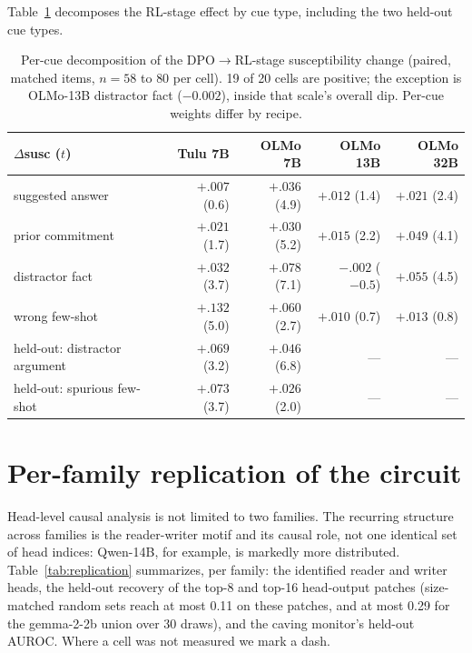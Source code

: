 \documentclass{article}
\begin{document}
Table~\ref{tab:percue} decomposes the RL-stage effect by cue type, including the two held-out cue types.
\begin{table}[h]
\centering\small
\begin{tabular}{lrrrr}
\toprule
$\Delta$susc ($t$) & Tulu 7B & OLMo 7B & OLMo 13B & OLMo 32B \\
\midrule
suggested answer & $+.007$ (0.6) & $+.036$ (4.9) & $+.012$ (1.4) & $+.021$ (2.4) \\
prior commitment & $+.021$ (1.7) & $+.030$ (5.2) & $+.015$ (2.2) & $+.049$ (4.1) \\
distractor fact & $+.032$ (3.7) & $+.078$ (7.1) & $-.002$ ($-0.5$) & $+.055$ (4.5) \\
wrong few-shot & $+.132$ (5.0) & $+.060$ (2.7) & $+.010$ (0.7) & $+.013$ (0.8) \\
held-out: distractor argument & $+.069$ (3.2) & $+.046$ (6.8) & --- & --- \\
held-out: spurious few-shot & $+.073$ (3.7) & $+.026$ (2.0) & --- & --- \\
\bottomrule
\end{tabular}
\caption{Per-cue decomposition of the DPO$\rightarrow$RL-stage susceptibility change (paired, matched items, $n=58$ to $80$ per cell). 19 of 20 cells are positive; the exception is OLMo-13B distractor fact ($-0.002$), inside that scale's overall dip. Per-cue weights differ by recipe.}
\label{tab:percue}
\end{table}

\section{Per-family replication of the circuit}
\label{app:replication}
Head-level causal analysis is not limited to two families. The recurring structure across families is the reader-writer motif and its causal role, not one identical set of head indices: Qwen-14B, for example, is markedly more distributed. Table~\ref{tab:replication} summarizes, per family: the identified reader and writer heads, the held-out recovery of the top-8 and top-16 head-output patches (size-matched random sets reach at most 0.11 on these patches, and at most 0.29 for the gemma-2-2b union over 30 draws), and the caving monitor's held-out AUROC. Where a cell was not measured we mark a dash.
\end{document}
